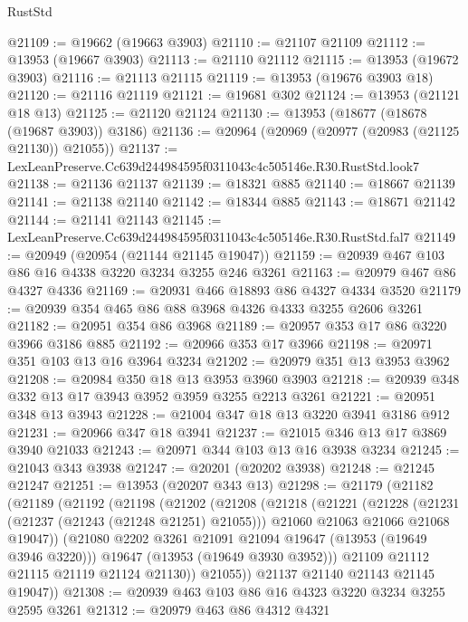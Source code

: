 \begin{lexlean}{RustStd}
\begin{coremodule}
@21109 := @19662 (@19663 @3903)
@21110 := @21107 @21109
@21112 := @13953 (@19667 @3903)
@21113 := @21110 @21112
@21115 := @13953 (@19672 @3903)
@21116 := @21113 @21115
@21119 := @13953 (@19676 @3903 @18)
@21120 := @21116 @21119
@21121 := @19681 @302
@21124 := @13953 (@21121 @18 @13)
@21125 := @21120 @21124
@21130 := @13953 (@18677 (@18678 (@19687 @3903)) @3186)
@21136 := @20964 (@20969 (@20977 (@20983 (@21125 @21130)) @21055))
@21137 := LexLeanPreserve.Cc639d244984595f0311043c4c505146e.R30.RustStd.look7
@21138 := @21136 @21137
@21139 := @18321 @885
@21140 := @18667 @21139
@21141 := @21138 @21140
@21142 := @18344 @885
@21143 := @18671 @21142
@21144 := @21141 @21143
@21145 := LexLeanPreserve.Cc639d244984595f0311043c4c505146e.R30.RustStd.fal7
@21149 := @20949 (@20954 (@21144 @21145 @19047))
@21159 := @20939 @467 @103 @86 @16 @4338 @3220 @3234 @3255 @246 @3261
@21163 := @20979 @467 @86 @4327 @4336
@21169 := @20931 @466 @18893 @86 @4327 @4334 @3520
@21179 := @20939 @354 @465 @86 @88 @3968 @4326 @4333 @3255 @2606 @3261
@21182 := @20951 @354 @86 @3968
@21189 := @20957 @353 @17 @86 @3220 @3966 @3186 @885
@21192 := @20966 @353 @17 @3966
@21198 := @20971 @351 @103 @13 @16 @3964 @3234
@21202 := @20979 @351 @13 @3953 @3962
@21208 := @20984 @350 @18 @13 @3953 @3960 @3903
@21218 := @20939 @348 @332 @13 @17 @3943 @3952 @3959 @3255 @2213 @3261
@21221 := @20951 @348 @13 @3943
@21228 := @21004 @347 @18 @13 @3220 @3941 @3186 @912
@21231 := @20966 @347 @18 @3941
@21237 := @21015 @346 @13 @17 @3869 @3940 @21033
@21243 := @20971 @344 @103 @13 @16 @3938 @3234
@21245 := @21043 @343 @3938
@21247 := @20201 (@20202 @3938)
@21248 := @21245 @21247
@21251 := @13953 (@20207 @343 @13)
@21298 := @21179
    (@21182
      (@21189
        (@21192
          (@21198
            (@21202
              (@21208
                (@21218
                  (@21221
                    (@21228
                      (@21231 (@21237 (@21243 (@21248 @21251) @21055)))
                      @21060
                      @21063
                      @21066
                      @21068
                      @19047))
                  (@21080 @2202 @3261 @21091 @21094 @19647 (@13953 (@19649 @3946 @3220)))
                  @19647
                  (@13953 (@19649 @3930 @3952)))
                @21109
                @21112
                @21115
                @21119
                @21124
                @21130))
            @21055))
        @21137
        @21140
        @21143
        @21145
        @19047))
@21308 := @20939 @463 @103 @86 @16 @4323 @3220 @3234 @3255 @2595 @3261
@21312 := @20979 @463 @86 @4312 @4321

\end{coremodule}
\end{lexlean}
